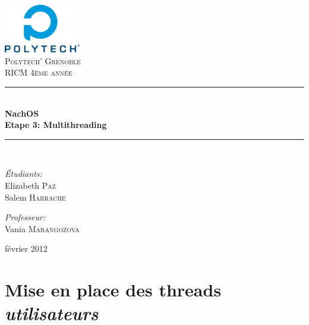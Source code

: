 \documentclass[a4paper,10pt]{article}
\newcommand{\HRule}{\rule{\linewidth}{0.5mm}}
\begin{document}
\begin{titlepage}

\begin{center}


\includegraphics[width=0.25\textwidth]{./images/logo}\\[1cm]

\textsc{\LARGE Polytech' Grenoble}\\[1.5cm]

\textsc{\Large RICM 4\`eme ann\'ee}\\[1.2cm]


\HRule \\[0.4cm]
{ \huge \bfseries NachOS\\[0.6cm]
Etape 3: Multithreading}
\\[0.4cm]

\HRule \\[2cm]

\begin{minipage}{0.4\textwidth}
\begin{flushleft} \large
\emph{\'Etudiants:}\\
Elizabeth \textsc{Paz} \\
Salem \textsc{Harrache}
\end{flushleft}
\end{minipage}
\begin{minipage}{0.4\textwidth}
\begin{flushright} \large
\emph{Professeur:} \\
Vania \textsc{Marangozova}
\end{flushright}
\end{minipage}

\vfill

{\large  février 2012}

\end{center}

\end{titlepage}

\section{Mise en place des threads \textit{utilisateurs}}
\end{document}
